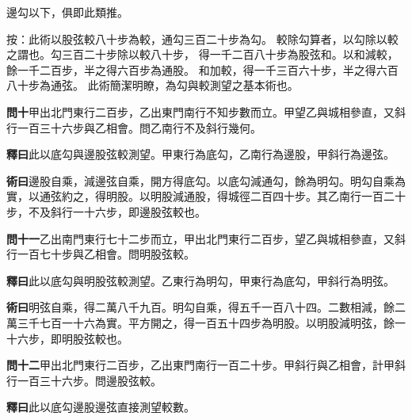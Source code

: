 \documentclass[12pt,a4paper]{article}
\begin{document}
邊勾以下，俱即此類推。

\vspace{0.3em}

\noindent
按：此術以股弦較八十步為較，通勾三百二十步為勾。
較除勾算者，以勾除以較之謂也。勾三百二十步除以較八十步，
得一千二百八十步為股弦和。以和減較，餘一千二百步，半之得六百步為通股。
和加較，得一千三百六十步，半之得六百八十步為通弦。
此術簡潔明瞭，為勾與較測望之基本術也。

\vspace{0.5em}

\noindent\textbf{問十}\quad 甲出北門東行二百步，乙出東門南行不知步數而立。甲望乙與城相參直，又斜行一百三十六步與乙相會。問乙南行不及斜行幾何。

\vspace{0.3em}

\noindent\textbf{釋曰}\quad 此以底勾與邊股弦較測望。甲東行為底勾，乙南行為邊股，甲斜行為邊弦。

\vspace{0.3em}

\noindent\textbf{術曰}\quad 邊股自乘，減邊弦自乘，開方得底勾。以底勾減通勾，餘為明勾。明勾自乘為實，以通弦約之，得明股。以明股減通股，得城徑二百四十步。其乙南行一百二十步，不及斜行一十六步，即邊股弦較也。

\vspace{0.5em}

\noindent\textbf{問十一}\quad 乙出南門東行七十二步而立，甲出北門東行二百步，望乙與城相參直，又斜行一百七十步與乙相會。問明股弦較。

\vspace{0.3em}

\noindent\textbf{釋曰}\quad 此以底勾與明股弦較測望。乙東行為明勾，甲東行為底勾，甲斜行為明弦。

\vspace{0.3em}

\noindent\textbf{術曰}\quad 明弦自乘，得二萬八千九百。明勾自乘，得五千一百八十四。二數相減，餘二萬三千七百一十六為實。平方開之，得一百五十四步為明股。以明股減明弦，餘一十六步，即明股弦較也。

\vspace{0.5em}

\noindent\textbf{問十二}\quad 甲出北門東行二百步，乙出東門南行一百二十步。甲斜行與乙相會，計甲斜行一百三十六步。問邊股弦較。

\vspace{0.3em}

\noindent\textbf{釋曰}\quad 此以底勾邊股邊弦直接測望較數。
\end{document}
